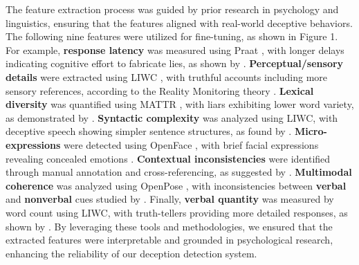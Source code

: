 \documentclass{article} %
\begin{document}
The feature extraction process was guided by prior research in psychology and linguistics, ensuring that the features aligned with real-world deceptive behaviors. The following nine features were utilized for fine-tuning, as shown in Figure 1. For example, \textbf{response latency} was measured using Praat \citep{Boersma2001}, with longer delays indicating cognitive effort to fabricate lies, as shown by \citep{Vrij2011}. \textbf{Perceptual/sensory details} were extracted using LIWC \citep{Pennebaker2015}, with truthful accounts including more sensory references, according to the Reality Monitoring theory \citep{Sporer1997}. \textbf{Lexical diversity} was quantified using MATTR \citep{Covington2010}, with liars exhibiting lower word variety, as demonstrated by \citep{Newman2003}. \textbf{Syntactic complexity} was analyzed using LIWC, with deceptive speech showing simpler sentence structures, as found by \citep{Hancock2008}. \textbf{Micro-expressions} were detected using OpenFace \citep{Baltrušaitis2018}, with brief facial expressions revealing concealed emotions \citep{Porter2008}. \textbf{Contextual inconsistencies }were identified through manual annotation and cross-referencing, as suggested by \citep{10.1177/0261927X02021004006}. \textbf{Multimodal coherence} was analyzed using OpenPose \citep{Cao2017}, with inconsistencies between \textbf{verbal} and \textbf{nonverbal} cues studied by \citep{10.1177/0261927X02021004008}. Finally, \textbf{verbal quantity} was measured by word count using LIWC, with truth-tellers providing more detailed responses, as shown by \citep{10.1177/0963721410391245}. By leveraging these tools and methodologies, we ensured that the extracted features were interpretable and grounded in psychological research, enhancing the reliability of our deception detection system. 

\end{document}
